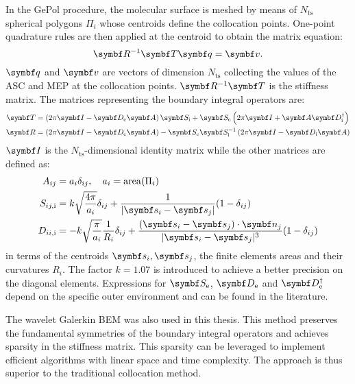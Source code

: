 In the GePol procedure, the molecular surface is meshed by means of
$N_\mathrm{ts}$ spherical polygons $\Pi_i$ whose centroids define the
collocation points. One-point quadrature rules are then applied at the
centroid to obtain the matrix equation:
\begin{equation}
 \mat{R}^{-1}\mat{T} \vect{q}
  =
  \vect{v}.
\end{equation}
$\vect{q}$ and $\vect{v}$ are vectors of dimension $N_\mathrm{ts}$
collecting the values of the \acrshort{ASC} and \gls{MEP}
at the collocation points. $\mat{R}^{-1}\mat{T}$ is the stiffness
matrix.
The matrices representing the boundary integral operators are:
\begin{align}
  \mat{T} &=
  \left(2\pi\mat{I} - \mat{D}_\mathrm{e}\mat{A}\right)\mat{S}_\mathrm{i}
  +\mat{S}_\mathrm{e}\left(2\pi\mat{I} +
  \mat{A}\mat{D}_\mathrm{i}^\dagger\right) \\
  \mat{R} &=
  \left(2\pi\mat{I} - \mat{D}_\mathrm{e}\mat{A}\right) -
  \mat{S}_\mathrm{e}\mat{S}^{-1}_\mathrm{i}\left(2\pi\mat{I}-\mat{D}_\mathrm{i}\mat{A}\right)
\end{align}
$\mat{I}$ is the $N_\mathrm{ts}$-dimensional identity matrix while the
other matrices are defined as:
\begin{subequations}
  \begin{align}
    A_{ij} &= a_i\delta_{ij}, \quad a_i = \mathrm{area}(\Pi_i) \\
    S_{ij, \mathrm{i}} &=
    k\sqrt{\frac{4\pi}{a_i}}\delta_{ij} +
    \frac{1}{|\vect{s}_i-\vect{s}_j|}(1-\delta_{ij}) \\
    D_{ii, \mathrm{i}} &=
    -k\sqrt{\frac{\pi}{a_i}}\frac{1}{R_i}\delta_{ij}
    + \frac{(\vect{s}_i-\vect{s}_j)\cdot\vect{n}_j}{|\vect{s}_i-\vect{s}_j|^3}(1-\delta_{ij})
  \end{align}
\end{subequations}
in terms of the centroids $\vect{s}_i, \vect{s}_j$, the finite elements
areas and their curvatures $R_i$.
The factor $k=1.07$ is introduced to achieve a better precision on the
diagonal elements.\autocite{Tomasi2005-vm}
Expressions for $\mat{S}_\mathrm{e}$, $\mat{D}_\mathrm{e}$ and
$\mat{D}^\dagger_\mathrm{e}$ depend on the specific outer environment
and can be found in the literature.\autocite{Corni2002-dr, Frediani2004-er,
Tomasi2005-vm, Delgado2013-kd, DiRemigio2016-nn}

The wavelet Galerkin \acrshort{BEM} was also used in this thesis. This method
preserves the fundamental symmetries of the boundary integral operators
and achieves sparsity in the stiffness matrix.
This sparsity can be leveraged to implement efficient algorithms with
linear space and time complexity. The approach is thus superior
to the traditional collocation method.

